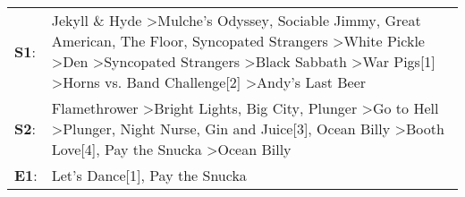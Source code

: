 \begin{supertabular}{p{0.03\textwidth}p{0.92\textwidth}}
 \textbf{S1}:  &  Jekyll \& Hyde\textsuperscript{} \textgreater \enspace Mulche's Odyssey\textsuperscript{}, \enspace Sociable Jimmy\textsuperscript{}, \enspace Great American\textsuperscript{}, \enspace The Floor\textsuperscript{}, \enspace Syncopated Strangers\textsuperscript{} \textgreater \enspace White Pickle\textsuperscript{} \textgreater \enspace Den\textsuperscript{} \textgreater \enspace Syncopated Strangers\textsuperscript{} \textgreater \enspace Black Sabbath\textsuperscript{} \textgreater \enspace War Pigs[1]\textsuperscript{} \textgreater \enspace Horns vs. Band Challenge[2]\textsuperscript{} \textgreater \enspace Andy's Last Beer\textsuperscript{}  \enspace  \\
 \textbf{S2}:  &                                                                                                                                                      Flamethrower\textsuperscript{} \textgreater \enspace Bright Lights, Big City\textsuperscript{}, \enspace Plunger\textsuperscript{} \textgreater \enspace Go to Hell\textsuperscript{} \textgreater \enspace Plunger\textsuperscript{}, \enspace Night Nurse\textsuperscript{}, \enspace Gin and Juice[3]\textsuperscript{}, \enspace Ocean Billy\textsuperscript{} \textgreater \enspace Booth Love[4]\textsuperscript{}, \enspace Pay the Snucka\textsuperscript{} \textgreater \enspace Ocean Billy\textsuperscript{}  \enspace  \\
 \textbf{E1}:  &                                                                                                                                                                                                                                                                                                                                                                                                                                                                                                                                                                                                  Let's Dance[1]\textsuperscript{}, \enspace Pay the Snucka\textsuperscript{}  \enspace  \\
\end{supertabular}
